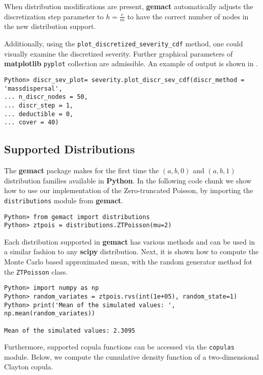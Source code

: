 \documentclass{article}
\begin{document}
When distribution modifications are present, \textbf{gemact} automatically adjusts the discretization step parameter to $h=\frac{c}{m}$ to have the correct number of nodes in the new distribution support.


Additionally, using the \texttt{plot\_discretized\_severity\_cdf} method, one could visually examine the discretized severity.
Further graphical parameters of \textbf{matplotlib} \cite{Hunter:2007}  \texttt{pyplot} collection are admissible. An example of output is shown in .

\begin{lstlisting}
Python> discr_sev_plot= severity.plot_discr_sev_cdf(discr_method = 'massdispersal',
... n_discr_nodes = 50,
... discr_step = 1,
... deductible = 0,
... cover = 40)
\end{lstlisting}

\subsection{Supported Distributions}

The \textbf{gemact} package makes for the first time the $(a,b,0)$ and $(a,b,1)$ distribution families \cite[p~81]{klugman98} available in \textbf{Python}.
In the following code chunk we show how to use our implementation of the Zero-truncated Poisson, by importing the \texttt{distributions} module from \textbf{gemact}.

\begin{lstlisting}
Python> from gemact import distributions
Python> ztpois = distributions.ZTPoisson(mu=2)
\end{lstlisting}

Each distribution supported in \textbf{gemact} has various methods and can be used in a similar fashion to any \textbf{scipy} distribution.
Next, it is shown how to compute the Monte Carlo based approximated mean, with the random generator method fot the \texttt{ZTPoisson} class.

\begin{lstlisting}
Python> import numpy as np
Python> random_variates = ztpois.rvs(int(1e+05), random_state=1)
Python> print('Mean of the simulated values: ', np.mean(random_variates))

Mean of the simulated values: 2.3095
\end{lstlisting}

Furthermore, supported copula functions can be accessed via the \texttt{copulas} module. Below, we compute the cumulative density function of a two-dimensional Clayton copula.
\end{document}
